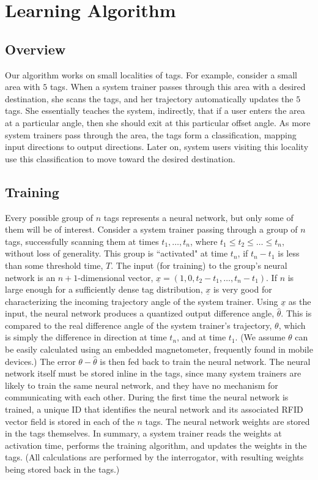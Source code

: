 \documentclass[conference]{IEEEtran}
\begin{document}
\section{Learning Algorithm}
\label{Section: Learning Algorithm}
\subsection{Overview}
Our algorithm works on small localities of tags. For example, consider a small area with $5$ tags. When a system trainer passes through this area with a desired destination, she scans the tags, and her trajectory automatically updates the $5$ tags. She essentially teaches the system, indirectly, that if a user enters the area at a particular angle, then she should exit at this particular offset angle. As more system trainers pass through the area, the tags form a classification, mapping input directions to output directions. Later on, system users visiting this locality use this classification to move toward the desired destination.
\subsection{Training}
Every possible group of $n$ tags represents a neural network, but only some of them will be of interest. Consider a system trainer passing through a group of $n$ tags, successfully scanning them at times $t_1, \ldots, t_n$, where $t_1 \le t_2 \le \ldots \le t_n$, without loss of generality. This group is ``activated" at time $t_n$, if $t_n - t_1$ is less than some threshold time, $T$. The input (for training) to the group's neural network is an $n+1$-dimensional vector, $\underline{x} = \left(1, 0, t_2-t_1, \ldots, t_n - t_1\right)$. If $n$ is large enough for a sufficiently dense tag distribution, $\underline{x}$ is very good for characterizing the incoming trajectory angle of the system trainer. Using $\underline{x}$ as the input, the neural network produces a quantized output difference angle, $\hat{\theta}$. This is compared to the real difference angle of the system trainer's trajectory, $\theta$, which is simply the difference in direction at time $t_n$, and at time $t_1$. (We assume $\theta$ can be easily calculated using an embedded magnetometer, frequently found in mobile devices.) The error $\theta - \hat\theta$ is then fed back to train the neural network. The neural network itself must be stored inline in the tags, since many system trainers are likely to train the same neural network, and they have no mechanism for communicating with each other. During the first time the neural network is trained, a unique ID that identifies the neural network and its associated RFID vector field is stored in each of the $n$ tags. The neural network weights are stored in the tags themselves. In summary, a system trainer reads the weights at activation time, performs the training algorithm, and updates the weights in the tags. (All calculations are performed by the interrogator, with resulting weights being stored back in the tags.)
\end{document}
